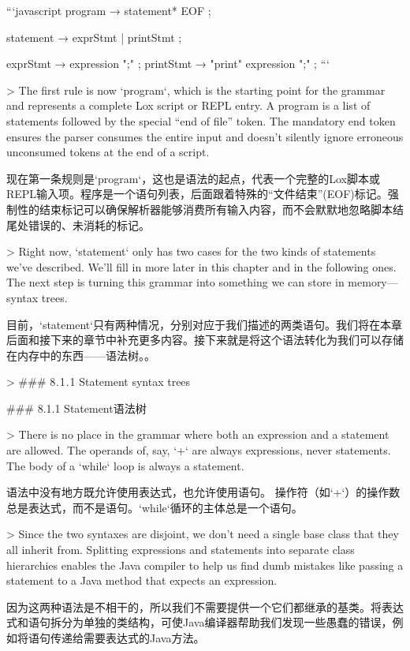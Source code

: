\documentclass[cn,11pt,chinese]{elegantbook}
\begin{document}
{{{```javascript
program        → statement* EOF ;

statement      → exprStmt
               | printStmt ;

exprStmt       → expression ";" ;
printStmt      → "print" expression ";" ;
```

> The first rule is now `program`, which is the starting point for the grammar and represents a complete Lox script or REPL entry. A program is a list of statements followed by the special “end of file” token. The mandatory end token ensures the parser consumes the entire input and doesn’t silently ignore erroneous unconsumed tokens at the end of a script.

现在第一条规则是`program`，这也是语法的起点，代表一个完整的Lox脚本或REPL输入项。程序是一个语句列表，后面跟着特殊的“文件结束”(EOF)标记。强制性的结束标记可以确保解析器能够消费所有输入内容，而不会默默地忽略脚本结尾处错误的、未消耗的标记。

> Right now, `statement` only has two cases for the two kinds of statements we’ve described. We’ll fill in more later in this chapter and in the following ones. The next step is turning this grammar into something we can store in memory—syntax trees.

目前，`statement`只有两种情况，分别对应于我们描述的两类语句。我们将在本章后面和接下来的章节中补充更多内容。接下来就是将这个语法转化为我们可以存储在内存中的东西——语法树。。

> ### 8 . 1 . 1 Statement syntax trees

### 8.1.1 Statement语法树

> There is no place in the grammar where both an expression and a statement are allowed. The operands of, say, `+` are always expressions, never statements. The body of a `while` loop is always a statement.

语法中没有地方既允许使用表达式，也允许使用语句。 操作符（如`+`）的操作数总是表达式，而不是语句。`while`循环的主体总是一个语句。

> Since the two syntaxes are disjoint, we don’t need a single base class that they all inherit from. Splitting expressions and statements into separate class hierarchies enables the Java compiler to help us find dumb mistakes like passing a statement to a Java method that expects an expression.

因为这两种语法是不相干的，所以我们不需要提供一个它们都继承的基类。将表达式和语句拆分为单独的类结构，可使Java编译器帮助我们发现一些愚蠢的错误，例如将语句传递给需要表达式的Java方法。

}}}
\end{document}
